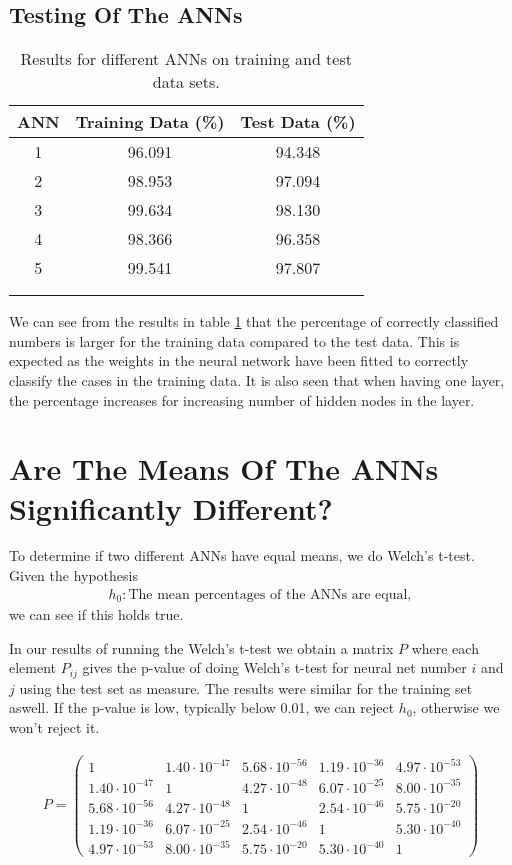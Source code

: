 \documentclass[11pt,a4paper]{article}
\begin{document}
\subsection{Testing Of The ANNs}

\begin{table}
\centering
\caption{Results for different ANNs on training and test data sets.}
\begin{tabular}{ c c c }
ANN & Training Data (\%) & Test Data (\%)
 \\
  \hline  
  1 & 96.091 & 94.348\\
  2 & 98.953 & 97.094\\
  3 & 99.634 & 98.130\\
  4 & 98.366 & 96.358\\
  5 & 99.541 & 97.807\\
  \hline\\
  \label{tab:meanPercentage}
\end{tabular}
\end{table}

We can see from the results in table \ref{tab:meanPercentage} that the percentage of correctly classified numbers is larger for the training data compared to the test data. This is expected as the weights in the neural network have been fitted to correctly classify the cases in the training data. It is also seen that when having one layer, the percentage increases for increasing number of hidden nodes in the layer.

\section{Are The Means Of The ANNs Significantly Different?}
To determine if two different ANNs have equal means, we do Welch's t-test. Given the hypothesis
\begin{align}
h_0: \textrm{The mean percentages of the ANNs are equal},
\end{align}
we can see if this holds true. 

In our results of running the Welch's t-test we obtain a matrix $P$ where each element $P_{ij}$ gives the p-value of doing Welch's t-test for neural net number $i$ and $j$ using the test set as measure. The results were similar for the training set aswell. If the p-value is low, typically below 0.01, we can reject $h_0$, otherwise we won't reject it.

\begin{align}
\label{tab:welchTable}
P = \begin{pmatrix}
1 & 1.40\cdot10^{-47} & 5.68\cdot10^{-56} & 1.19\cdot10^{-36} & 4.97\cdot10^{-53}\\
1.40\cdot10^{-47} & 1 & 4.27\cdot10^{-48} & 6.07\cdot10^{-25} & 8.00\cdot10^{-35}\\
5.68\cdot10^{-56} & 4.27\cdot10^{-48} & 1 & 2.54\cdot10^{-46} & 5.75\cdot10^{-20}\\
1.19\cdot10^{-36} & 6.07\cdot10^{-25} & 2.54\cdot10^{-46} & 1 & 5.30\cdot10^{-40}\\
4.97\cdot10^{-53} & 8.00\cdot10^{-35} & 5.75\cdot10^{-20} & 5.30\cdot10^{-40} & 1
\end{pmatrix}
\end{align}
\end{document}
